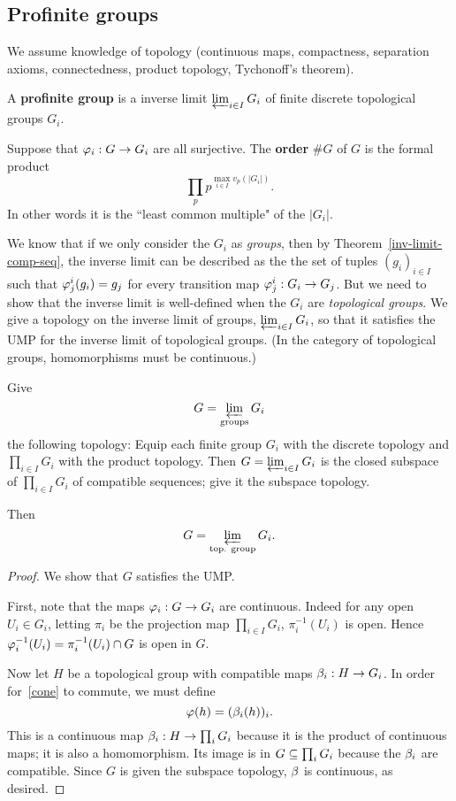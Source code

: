 \subsection{Profinite groups}
We assume knowledge of topology (continuous maps, compactness, separation axioms, connectedness, product topology, Tychonoff's theorem).
\begin{df}
A \textbf{profinite group} is a inverse limit $\varprojlim_{i\in I} G_i$ of finite discrete topological groups $G_i$. 

Suppose that $\varphi_i:G\to G_i$ are all surjective. The \textbf{order} $\# G$ of $G$ is the formal product
\[
\prod_p p^{\max_{i\in I}v_p(|G_i|)}.
\]
In other words it is the ``least common multiple" of the $|G_i|$.
\end{df}
We know that if we only consider the $G_i$ as {\it groups}, then by Theorem~\ref{inv-limit-comp-seq}, the inverse limit can be described as the the set of tuples $(g_i)_{i\in I}$ such that $\varphi^i_j(g_i)=g_j$ for every transition map $\varphi^i_j:G_i\to G_j$. But we need to show that the inverse limit is well-defined when the $G_i$ are {\it topological groups}. We give a topology on the inverse limit of groups, $\varprojlim_{i\in I} G_i$, so that it satisfies the UMP for the inverse limit of topological groups. (In the category of topological groups, homomorphisms must be continuous.)
\begin{pr}
Give \[
G=\varprojlim_{\text{groups}} G_i\]
the following topology:
Equip each finite group $G_i$ with the discrete topology and $\prod_{i\in I} G_i$ with the product topology. 
Then $G=\varprojlim_{i\in I}G_i$ is the closed subspace of $\prod_{i\in I} G_i$ of compatible sequences; %
give it the subspace topology.

Then
\[
G=\varprojlim_{\text{top. group}} G_i.
\]
\end{pr}
\begin{proof}
We show that $G$ satisfies the UMP.

First, note that the maps $\varphi_i:G\to G_i$ are continuous. Indeed for any open $U_i\in G_i$, letting $\pi_i$ be the projection map $\prod_{i\in I} G_i$, $\pi_i^{-1}(U_i)$ is open. Hence $\varphi_i^{-1}(U_i)=\pi_i^{-1}(U_i)\cap G$ is open in $G$.

Now let $H$ be a topological group with compatible maps $\beta_i:H\to G_i$. In order for~\ref{cone} to commute, we must define
\[
\varphi(h)=(\beta_i(h))_i.
\]
This is a continuous map $\beta_i:H\to \prod_i G_i$ because it is the product of continuous maps; it is also a homomorphism. Its image is in $G\subseteq \prod_i G_i$ because the $\beta_i$ are compatible. Since $G$ is given the subspace topology, $\beta$ is continuous, as desired.
\end{proof}
